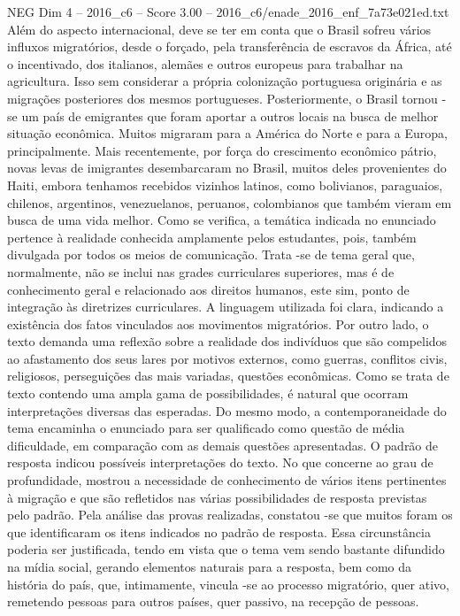 \begin{textsample}{NEG Dim 4 – 2016\_c6 – Score 3.00 – 2016\_c6/enade\_2016\_enf\_7a73e021ed.txt}
Além do aspecto internacional, deve se ter em conta que o Brasil sofreu vários influxos migratórios, desde o forçado, pela transferência de escravos da África, até o incentivado, dos italianos, alemães e outros europeus para trabalhar na agricultura.
Isso sem considerar a própria colonização portuguesa originária e as migrações posteriores dos mesmos portugueses.
Posteriormente, o Brasil tornou -se um país de emigrantes que foram aportar a outros locais na busca de melhor situação econômica.
Muitos migraram para a América do Norte e para a Europa, principalmente.
Mais recentemente, por força do crescimento econômico pátrio, novas levas de imigrantes desembarcaram no Brasil, muitos deles provenientes do Haiti, embora tenhamos recebidos vizinhos latinos, como bolivianos, paraguaios, chilenos, argentinos, venezuelanos, peruanos, colombianos que também vieram em busca de uma vida melhor.
Como se verifica, a temática indicada no enunciado pertence à realidade conhecida amplamente pelos estudantes, pois, também divulgada por todos os meios de comunicação.
Trata -se de tema geral que, normalmente, não se inclui nas grades curriculares superiores, mas é de conhecimento geral e relacionado aos direitos humanos, este sim, ponto de integração às diretrizes curriculares.
A linguagem utilizada foi clara, indicando a existência dos fatos vinculados aos movimentos migratórios.
Por outro lado, o texto demanda uma reflexão sobre a realidade dos indivíduos que são compelidos ao afastamento dos seus lares por motivos externos, como guerras, conflitos civis, religiosos, perseguições das mais variadas, questões econômicas.
Como se trata de texto contendo uma ampla gama de possibilidades, é natural que ocorram interpretações diversas das esperadas.
Do mesmo modo, a contemporaneidade do tema encaminha o enunciado para ser qualificado como questão de média dificuldade, em comparação com as demais questões apresentadas.
O padrão de resposta indicou possíveis interpretações do texto.
No que concerne ao grau de profundidade, mostrou a necessidade de conhecimento de vários itens pertinentes à migração e que são refletidos nas várias possibilidades de resposta previstas pelo padrão.
Pela análise das provas realizadas, constatou -se que muitos foram os que identificaram os itens indicados no padrão de resposta.
Essa circunstância poderia ser justificada, tendo em vista que o tema vem sendo bastante difundido na mídia social, gerando elementos naturais para a resposta, bem como da história do país, que, intimamente, vincula -se ao processo migratório, quer ativo, remetendo pessoas para outros países, quer passivo, na recepção de pessoas.

\end{textsample}
